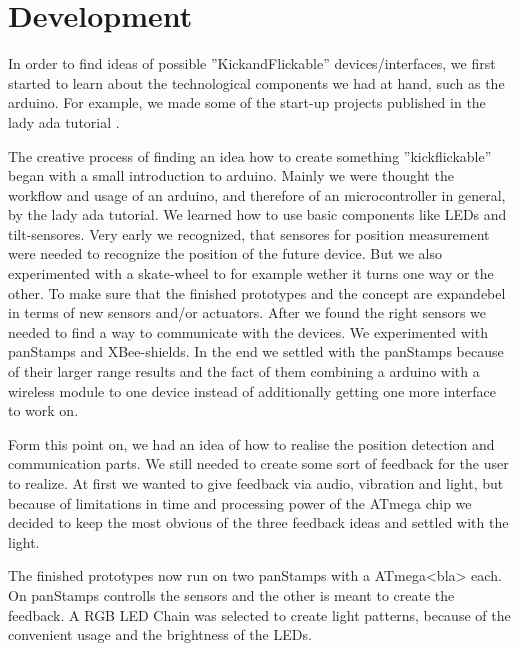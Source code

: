 \section{Development}
In order to find ideas of possible ''KickandFlickable'' devices/interfaces, we first started to learn about the technological components we had at hand, such as the arduino. For example, we made some of the start-up projects published in the lady ada tutorial \cite{lady_ada_arduino_tutorial}.




The creative process of finding an idea how to create something ''kickflickable'' began with a small introduction to arduino. Mainly we were thought the workflow and usage of an arduino, and therefore of an microcontroller in general, by the lady ada tutorial. \cite{lady_ada_arduino_tutorial}
We learned how to use basic components like LEDs and tilt-sensores. Very early we recognized, that sensores for position measurement were needed to recognize the position of the future device. But we also experimented with a skate-wheel to for example wether it turns one way or the other. To make sure that the finished prototypes and the concept are expandebel in terms of new sensors and/or actuators.
After we found the right sensors we needed to find a way to communicate with the devices. We experimented with panStamps \cite{panstamp} and XBee\cite{xbee}-shields. In the end we settled with the panStamps because of their larger range results and the fact of them combining a arduino with a wireless module to one device instead of additionally getting one more interface to work on.

Form this point on, we had an idea of how to realise the position detection and communication parts. We still needed to create some sort of feedback for the user to realize. 
At first we wanted to give feedback via audio, vibration and light, but because of limitations in time and processing power of the ATmega %
 chip we decided to keep the most obvious of the three feedback ideas and settled with the light.

The finished prototypes now run on two panStamps with a ATmega<bla> each. On panStamps controlls the sensors and the other is meant to create the feedback. 
A RGB LED Chain was selected to create light patterns, because of the convenient usage and the brightness of the LEDs. 

